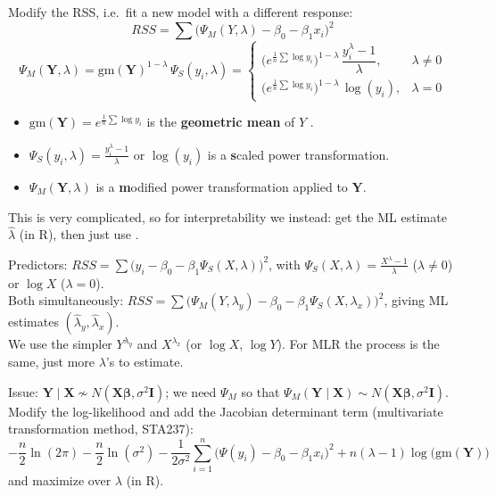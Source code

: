 \begin{definition}
    Modify the RSS, i.e.\ fit a new model with a different response:
    \[RSS=\sum\big(\Psi_M(Y,\lambda)-\beta_0-\beta_1x_i\big)^2\]
    \[\Psi_M(\mathbf{Y},\lambda)=\text{gm}(\mathbf{Y})^{1-\lambda}\,\Psi_S(y_i,\lambda)=
    \begin{cases}
        \big(e^{\frac1n\sum\log y_i}\big)^{1-\lambda}\,\dfrac{y_i^\lambda-1}{\lambda}, & \lambda\neq0\\[8pt]
        \big(e^{\frac1n\sum\log y_i}\big)^{1-\lambda}\,\log(y_i), & \lambda=0
    \end{cases}\]
    \begin{itemize}
        \item $\text{gm}(\mathbf{Y})=e^{\frac1n\sum\log y_i}$ is the \textbf{geometric mean}
        of $Y$ .
        \item $\Psi_S(y_i,\lambda)=\frac{y_i^\lambda-1}{\lambda}$ or $\log(y_i)$ is a
        \textbf{s}caled power transformation.
        \item $\Psi_M(\mathbf{Y},\lambda)$ is a \textbf{m}odified power transformation applied to $\mathbf{Y}$.
    \end{itemize}
    This is very complicated, so for interpretability we instead: get the ML
    estimate $\hat\lambda$ (in R), then just use .
\end{definition}

\begin{remark}
    Predictors: $RSS=\sum\big(y_i-\beta_0-\beta_1\Psi_S(X,\lambda)\big)^2$, with
    $\Psi_S(X,\lambda)=\frac{X^\lambda-1}{\lambda}$ ($\lambda\neq0$) or $\log X$ ($\lambda=0$).
    \\ Both simultaneously:
    $RSS=\sum\big(\Psi_M(Y,\lambda_y)-\beta_0-\beta_1\Psi_S(X,\lambda_x)\big)^2$,
    giving ML estimates $(\hat\lambda_y,\hat\lambda_x)$.
    \\ We use the simpler $Y^{\lambda_y}$ and $X^{\lambda_x}$ (or $\log X$, $\log Y$).
    For MLR the process is the same, just more $\lambda$'s to estimate.
\end{remark}

\begin{remark}
    Issue: $\mathbf{Y}\mid\mathbf{X}\not\sim N(\mathbf{X}\boldsymbol\beta,\sigma^2\mathbf{I})$;
    we need $\Psi_M$ so that $\Psi_M(\mathbf{Y}\mid\mathbf{X})\sim N(\mathbf{X}\boldsymbol\beta,\sigma^2\mathbf{I})$.
    Modify the log-likelihood and add the Jacobian determinant term (multivariate
    transformation method, STA237):
    \[-\frac n2\ln(2\pi)-\frac n2\ln(\sigma^2)-\frac1{2\sigma^2}\sum_{i=1}^n\big(\Psi(y_i)-\beta_0-\beta_1x_i\big)^2+n(\lambda-1)\log\big(\text{gm}(\mathbf{Y})\big)\]
    and maximize over $\lambda$ (in R).
\end{remark}

